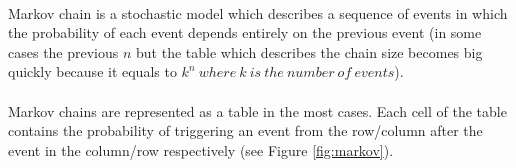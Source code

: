 \documentclass[]{article}
\begin{document}
        \paragraph{}Markov chain\cite{markov} is a stochastic model which describes a sequence of events in which the probability of each event depends entirely on the previous event (in some cases the previous $n$ but the table which describes the chain size becomes big quickly because it equals to $k^n\ where\ k\ is\ the\ number\ of\ events$).\paragraph{}
                Markov chains are represented as a table in the most cases. Each cell of the table contains the probability of triggering an event from the row/column after the event in the column/row respectively (see Figure \ref{fig:markov}).
\end{document}
